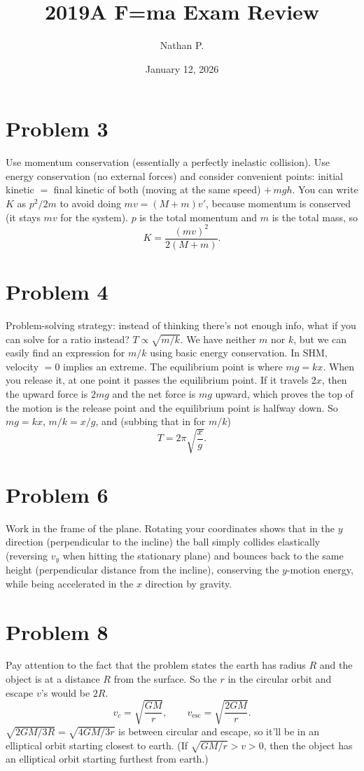 \documentclass[11pt]{article}
\title{2019A F=ma Exam Review}
\author{Nathan P.}
\date{January 12, 2026}
\begin{document}
\maketitle

\section*{Problem 3}
Use momentum conservation (essentially a perfectly inelastic collision).
Use energy conservation (no external forces) and consider convenient points: initial kinetic $=$ final kinetic of both (moving at the same speed) $+\,mgh$.
You can write $K$ as $p^2/2m$ to avoid doing $mv=(M+m)v'$, because momentum is conserved (it stays $mv$ for the system). $p$ is the total momentum and $m$ is the total mass, so
\[
K=\frac{(mv)^2}{2(M+m)}.
\]

\section*{Problem 4}
Problem-solving strategy: instead of thinking there's not enough info, what if you can solve for a ratio instead? $T\propto\sqrt{m/k}$. We have neither $m$ nor $k$, but we can easily find an expression for $m/k$ using basic energy conservation.
In SHM, velocity $=0$ implies an extreme. The equilibrium point is where $mg=kx$.
When you release it, at one point it passes the equilibrium point. If it travels $2x$, then the upward force is $2mg$ and the net force is $mg$ upward, which proves the top of the motion is the release point and the equilibrium point is halfway down. So $mg=kx$, $m/k=x/g$, and (subbing that in for $m/k$)
\[
T=2\pi\sqrt{\frac xg}.
\]

\section*{Problem 6}
Work in the frame of the plane. Rotating your coordinates shows that in the $y$ direction (perpendicular to the incline) the ball simply collides elastically (reversing $v_y$ when hitting the stationary plane) and bounces back to the same height (perpendicular distance from the incline), conserving the $y$-motion energy, while being accelerated in the $x$ direction by gravity.

\section*{Problem 8}
Pay attention to the fact that the problem states the earth has radius $R$ and the object is at a distance $R$ from the surface. So the $r$ in the circular orbit and escape $v$'s would be $2R$.
\[
v_c=\sqrt{\frac{GM}{r}},\qquad v_{\text{esc}}=\sqrt{\frac{2GM}{r}}.
\]
$\sqrt{2GM/3R}=\sqrt{4GM/3r}$ is between circular and escape, so it'll be in an elliptical orbit starting closest to earth.
(If $\sqrt{GM/r}>v>0$, then the object has an elliptical orbit starting furthest from earth.)
\end{document}
